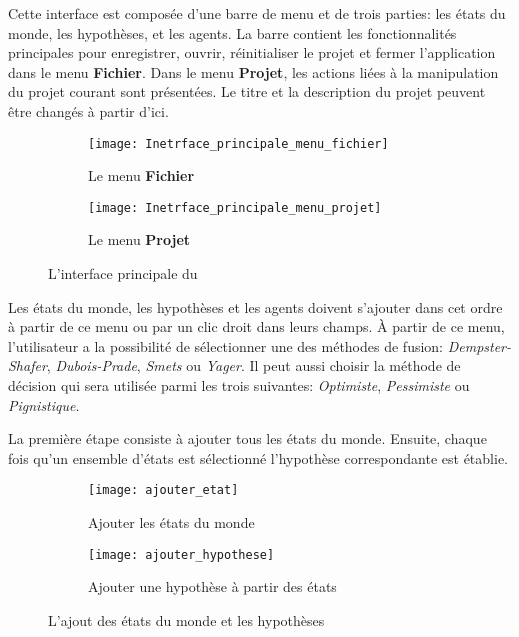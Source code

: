 Cette interface est composée d'une barre de menu et de trois parties: les états
du monde, les hypothèses, et les agents. La barre contient les fonctionnalités principales
pour enregistrer, ouvrir, réinitialiser le projet et fermer l'application dans le menu
\textbf{Fichier}. Dans le menu \textbf{Projet}, les actions liées à la manipulation
du projet courant sont présentées. Le titre et la description du projet peuvent être changés
à partir d'ici.\\[1em]

\begin{figure}[H]
\begin{subfigure}{0.49\textwidth}
\texttt{[image: Inetrface\_principale\_menu\_fichier]}
\caption{Le menu \textbf{Fichier}}
\end{subfigure}
\hfill
\begin{subfigure}{0.49\textwidth}
\texttt{[image: Inetrface\_principale\_menu\_projet]}
\caption{Le menu \textbf{Projet}}
\end{subfigure}
\caption{L'interface principale du \appname}
\end{figure}

Les états du monde, les hypothèses et les agents doivent s'ajouter dans cet ordre à partir
de ce menu ou par un clic droit dans leurs champs. \`A partir de ce menu, l'utilisateur a la possibilité de sélectionner une
des méthodes de fusion: \textit{Dempster-Shafer}, \textit{Dubois-Prade}, \textit{Smets} ou
\textit{Yager}. Il peut aussi choisir la méthode de décision qui sera utilisée parmi les trois
suivantes: \textit{Optimiste}, \textit{Pessimiste} ou \textit{Pignistique}.

La première étape consiste à ajouter tous les états du monde. Ensuite, chaque fois qu'un ensemble d'états est sélectionné
l'hypothèse correspondante est établie.\\[1em]

\begin{figure}[H]
\begin{subfigure}{0.49\textwidth}
\texttt{[image: ajouter\_etat]}
\caption{Ajouter les états du monde}
\end{subfigure}
\hfill
\begin{subfigure}{0.49\textwidth}
\texttt{[image: ajouter\_hypothese]}
\caption{Ajouter une hypothèse à partir des états}
\end{subfigure}
\caption{L'ajout des états du monde et les hypothèses}
\end{figure}

